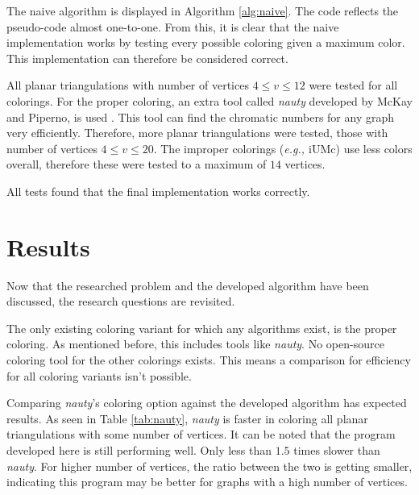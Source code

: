 \documentclass{article}
\begin{document}
The naive algorithm is displayed in Algorithm \ref{alg:naive}. The code reflects the pseudo-code almost one-to-one. From this, it is clear that the naive implementation works by testing every possible coloring given a maximum color. This implementation can therefore be considered correct.

All planar triangulations with number of vertices $4 \le v \le 12$ were tested for all colorings. 
For the proper coloring, an extra tool called \textit{nauty} developed by McKay and Piperno, is used \cite{mckay2014practical}. This tool can find the chromatic numbers for any graph very efficiently. Therefore, more planar triangulations were tested, those with number of vertices $4 \le v \le 20$.
The improper colorings (\textit{e.g., $\mathrm{iUMc}$}) use less colors overall, therefore these were tested to a maximum of $14$ vertices.

All tests found that the final implementation works correctly.

\section{Results}
\label{sec:results}

Now that the researched problem and the developed algorithm have been discussed, the research questions are revisited. 

The only existing coloring variant for which any algorithms exist, is the proper coloring. As mentioned before, this includes tools like \textit{nauty}. No open-source coloring tool for the other colorings exists. This means a comparison for efficiency for all coloring variants isn't possible.

Comparing \textit{nauty}'s coloring option against the developed algorithm has expected results. As seen in Table \ref{tab:nauty}, \textit{nauty} is faster in coloring all planar triangulations with some number of vertices. It can be noted that the program developed here is still performing well. Only less than $1.5$ times slower than \textit{nauty}. For higher number of vertices, the ratio between the two is getting smaller, indicating this program may be better for graphs with a high number of vertices.
\end{document}
